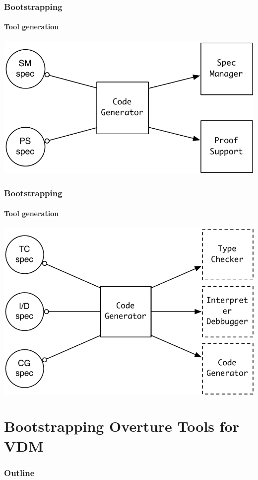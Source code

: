 \documentclass[slidestop,uncompress,mathserif,notes]{beamer}
\newcommand{\pgl}[0]{Peter Gorm Larsen}
\begin{document}
\begin{frame}[c]
  \frametitle{Bootstrapping}
  \framesubtitle{Tool generation}

  \begin{center}
    \includegraphics[width=.7\textwidth]{images/code_gen.pdf}
  \end{center}
\end{frame}

\begin{frame}[c]
  \frametitle{Bootstrapping}
  \framesubtitle{Tool generation}
 
  \begin{center}
    \includegraphics[width=.7\textwidth]{images/code_gen2.pdf}
  \end{center}
\end{frame}



\section[Overture]{Bootstrapping Overture Tools for VDM}
\label{sec:overture}

\begin{frame}[c]
  \frametitle{Outline}
  \tableofcontents[current]
\end{frame}
\end{document}
